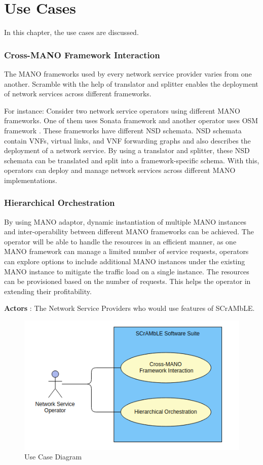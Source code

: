\chapter{Use Cases}
\label{ch:Use Cases}

In this chapter, the use cases are discussed.

\subsection{Cross-MANO Framework Interaction}
The MANO frameworks used by every network service provider varies from one another. Scramble with the help of translator and splitter enables the deployment of network services across different frameworks.

For instance: Consider two network service operators using different MANO frameworks. One of them uses Sonata framework \cite{draxler2017sonata} and another operator uses OSM framework \cite{ersue2013etsi}. These frameworks have different NSD schemata. NSD schemata contain VNFs, virtual links, and VNF forwarding graphs and also describes the deployment of a network service. By using a translator and splitter, these NSD schemata can be translated and split into a framework-specific schema. With this, operators can deploy and manage network services across different MANO implementations.

\subsection{Hierarchical Orchestration}
By using MANO adaptor, dynamic instantiation of multiple MANO instances and inter-operability between different MANO frameworks can be achieved. The operator will be able to handle the resources in an efficient manner, as one MANO framework can manage a limited number of service requests, operators can explore options to include additional MANO instances under the existing MANO instance to mitigate the traffic load on a single instance. The resources can be provisioned based on the number of requests. This helps the operator in extending their profitability.

\newpage
\textbf{Actors} : The Network Service Providers who would use features of SCrAMbLE.

\begin{figure}
	\includegraphics[width=1.0\linewidth]{figures/use-case}
	\caption{Use Case Diagram}
	\label{fig:use-case}
\end{figure}





